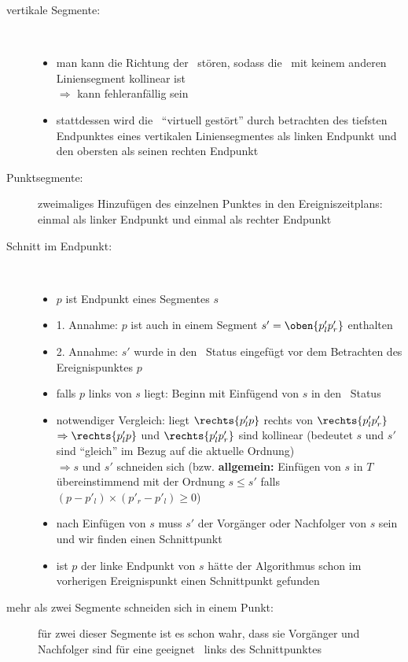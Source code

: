 \begin{description}
		\begin{description}
			\item[vertikale Segmente:] \ \\\up
				\begin{itemize}
					\item man kann die Richtung der \sweep~stören, sodass die \sweep~mit keinem anderen Liniensegment kollinear ist\\
						$\Rightarrow$ kann fehleranfällig sein
					\item stattdessen wird die \sweep~``virtuell gestört'' durch betrachten des tiefsten Endpunktes eines vertikalen Liniensegmentes als linken Endpunkt und den obersten als seinen rechten Endpunkt
				\end{itemize}
			\item[Punktsegmente:] zweimaliges Hinzufügen des einzelnen Punktes in den Ereigniszeitplans: einmal als linker Endpunkt und einmal als rechter Endpunkt
			\item[Schnitt im Endpunkt:] \ \\\up
				\begin{itemize}
					\item $p$ ist Endpunkt eines Segmentes $s$
					\item 1. Annahme: $p$ ist auch in einem Segment $s' = \oben{p'_lp'_r}$ enthalten
					\item 2. Annahme: $s'$ wurde in den \sweep~Status eingefügt vor dem Betrachten des Ereignispunktes $p$
					\item falls $p$ links von $s$ liegt: Beginn mit Einfügend von $s$ in den \sweep~Status
					\item notwendiger Vergleich: liegt $\rechts{p'_lp}$ rechts von $\rechts{p'_lp'_r}$\\
					$\Rightarrow \rechts{p'_lp}$ und $\rechts{p'_lp'_r}$ sind kollinear (bedeutet $s$ und $s'$ sind ``gleich'' im Bezug auf die aktuelle Ordnung)\\
					$\Rightarrow s$ und $s'$ schneiden sich (bzw. \textbf{allgemein:} Einfügen von $s$ in $T$ übereinstimmend mit der Ordnung $s \leq s'$ falls $(p-p'_l)\times (p'_r - p'_l)\geq 0$)
					\item nach Einfügen von $s$ muss $s'$ der Vorgänger oder Nachfolger von $s$ sein und wir finden einen Schnittpunkt
					\item ist $p$ der linke Endpunkt von $s$ hätte der Algorithmus schon im vorherigen Ereignispunkt einen Schnittpunkt gefunden
				\end{itemize}
			\item[mehr als zwei Segmente schneiden sich in einem Punkt:] für zwei dieser Segmente ist es schon wahr, dass sie Vorgänger und Nachfolger sind für eine geeignet \sweep~links des Schnittpunktes
		\end{description}
\end{description}
\topbreak
\up\up